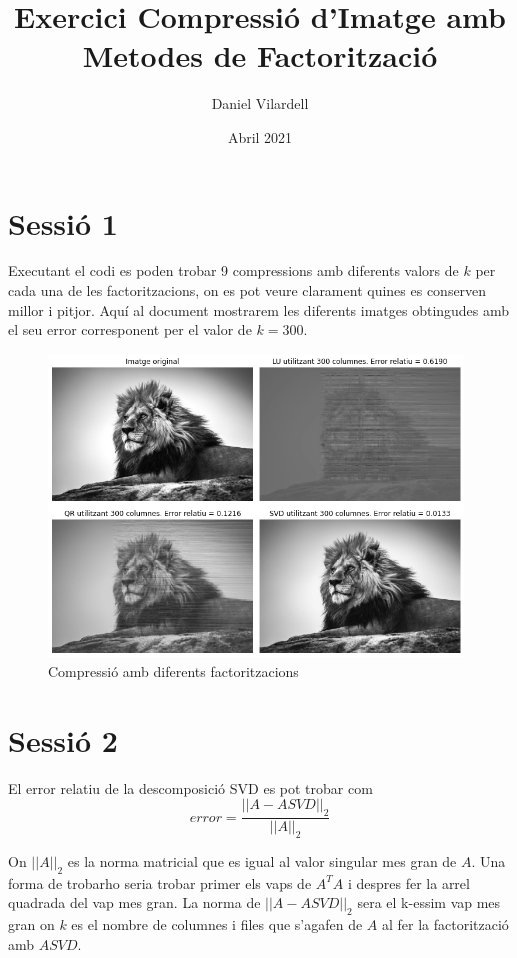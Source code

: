 \documentclass[12pt, a4papre]{article}
\author{Daniel Vilardell}
\title{Exercici Compressió d'Imatge amb Metodes de Factorització}
\date{Abril 2021}
\begin{document}
	\maketitle

	\section{Sessió 1}
		
	Executant el codi es poden trobar 9 compressions amb diferents valors de $k$ per cada una de les factoritzacions, on es pot veure clarament quines es conserven millor i pitjor. Aquí al document mostrarem les diferents imatges obtingudes amb el seu error corresponent per el valor de $k=300$.
	
	\begin{figure}[H]
		\begin{center}
		\includegraphics[width=110mm]{img_3_1.png}
		\caption{Compressió amb diferents factoritzacions}
		\end{center}
	\end{figure}
	
	\section{Sessió 2}
	
	El error relatiu de la descomposició SVD es pot trobar com 
	\[
		error = \frac{||A-ASVD||_2}{||A||_2}
	\]
	
	On $||A||_2$ es la norma matricial que es igual al valor singular mes gran de $A$. Una forma de trobarho seria trobar primer els vaps de $A^TA$ i despres fer la arrel quadrada del vap mes gran. La norma de $||A-ASVD||_2$ sera el k-essim vap mes gran on $k$ es el nombre de columnes i files que s'agafen de $A$ al fer la factorització amb $ASVD$.
	
\end{document}

